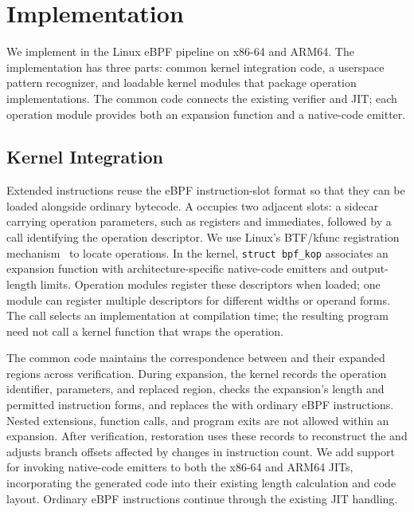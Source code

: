 \section{Implementation}
\label{sec:implementation}

We implement \tool in the Linux eBPF pipeline on x86-64 and ARM64. The implementation has three parts: common kernel integration code, a userspace pattern recognizer, and loadable kernel modules that package operation implementations. The common code connects the existing verifier and JIT; each operation module provides both an expansion function and a native-code emitter.

\subsection{Kernel Integration}
\label{subsec:kernel}

Extended instructions reuse the eBPF instruction-slot format so that they can be loaded alongside ordinary bytecode. A \kinsn occupies two adjacent slots: a sidecar carrying operation parameters, such as registers and immediates, followed by a call identifying the operation descriptor. We use Linux's BTF/kfunc registration mechanism~\cite{kfuncs} to locate operations. In the kernel, \texttt{struct bpf\_kop} associates an expansion function with architecture-specific native-code emitters and output-length limits. Operation modules register these descriptors when loaded; one module can register multiple descriptors for different widths or operand forms. The call selects an implementation at compilation time; the resulting program need not call a kernel function that wraps the operation.

The common code maintains the correspondence between \kinsns and their expanded regions across verification. During expansion, the kernel records the operation identifier, parameters, and replaced region, checks the expansion's length and permitted instruction forms, and replaces the \kinsn with ordinary eBPF instructions. Nested extensions, function calls, and program exits are not allowed within an expansion. After verification, restoration uses these records to reconstruct the \kinsns and adjusts branch offsets affected by changes in instruction count. We add support for invoking native-code emitters to both the x86-64 and ARM64 JITs, incorporating the generated code into their existing length calculation and code layout. Ordinary eBPF instructions continue through the existing JIT handling.

